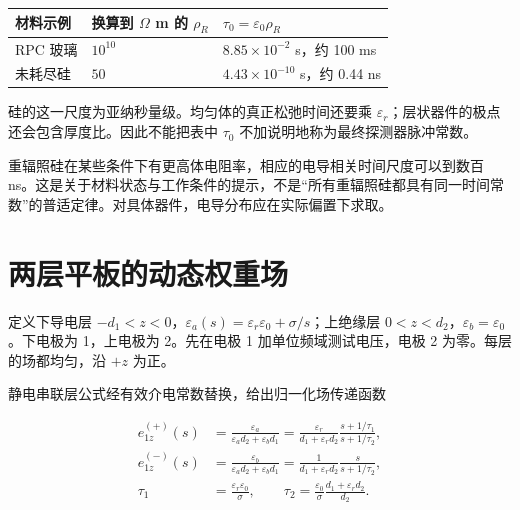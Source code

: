 \documentclass[
  11pt,
  a4paper,
  oneside,
  openany]{report}
\numberwithin{equation}{chapter}
\begin{document}
\begin{longtable}[]{@{}
  >{\raggedright\arraybackslash}p{}
  >{\raggedleft\arraybackslash}p{}
  >{\raggedleft\arraybackslash}p{}@{}}
\toprule\noalign{}
\begin{minipage}[b]{\linewidth}\raggedright
材料示例
\end{minipage} & \begin{minipage}[b]{\linewidth}\raggedleft
换算到 \(\Omega\) m 的 \(\rho_R\)
\end{minipage} & \begin{minipage}[b]{\linewidth}\raggedleft
\(\tau_0=\varepsilon_0\rho_R\)
\end{minipage} \\
\midrule\noalign{}
\endhead
\bottomrule\noalign{}
\endlastfoot
RPC 玻璃 & \(10^{10}\) & \(8.85\times10^{-2}\) s，约 100 ms \\
未耗尽硅 & \(50\) & \(4.43\times10^{-10}\) s，约 0.44 ns \\
\end{longtable}

硅的这一尺度为亚纳秒量级。均匀体的真正松弛时间还要乘
\(\varepsilon_r\)；层状器件的极点还会包含厚度比。因此不能把表中
\(\tau_0\) 不加说明地称为最终探测器脉冲常数。

重辐照硅在某些条件下有更高体电阻率，相应的电导相关时间尺度可以到数百
ns。这是关于材料状态与工作条件的提示，不是``所有重辐照硅都具有同一时间常数''的普适定律。对具体器件，电导分布应在实际偏置下求取。

\section{两层平板的动态权重场}\label{sec-planar-kernel}

定义下导电层
\(-d_1<z<0\)，\(\varepsilon_a(s)=\varepsilon_r\varepsilon_0+\sigma/s\)；上绝缘层
\(0<z<d_2\)，\(\varepsilon_b=\varepsilon_0\)。下电极为 1，上电极为
2。先在电极 1 加单位频域测试电压，电极 2 为零。每层的场都均匀，沿 \(+z\)
为正。

静电串联层公式经有效介电常数替换，给出归一化场传递函数

\begin{equation}
\begin{aligned}
e_{1z}^{(+)}(s)&=\frac{\varepsilon_a}{\varepsilon_ad_2+\varepsilon_bd_1}
=\frac{\varepsilon_r}{d_1+\varepsilon_rd_2}\frac{s+1/\tau_1}{s+1/\tau_2},\\
e_{1z}^{(-)}(s)&=\frac{\varepsilon_b}{\varepsilon_ad_2+\varepsilon_bd_1}
=\frac1{d_1+\varepsilon_rd_2}\frac{s}{s+1/\tau_2},\\
\tau_1&=\frac{\varepsilon_r\varepsilon_0}{\sigma},\qquad
\tau_2=\frac{\varepsilon_0}{\sigma}\frac{d_1+\varepsilon_rd_2}{d_2}.
\end{aligned}
\end{equation}
\end{document}
